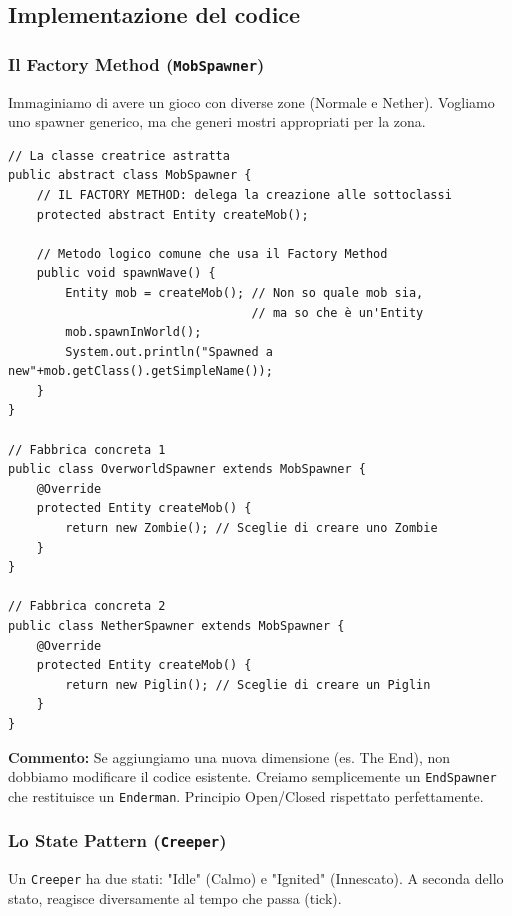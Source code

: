 \documentclass[12pt, a4paper]{article}
\begin{document}
\newpage

\subsection{Implementazione del codice}

\subsubsection{Il Factory Method (\texttt{MobSpawner})}
Immaginiamo di avere un gioco con diverse zone (Normale e Nether). Vogliamo uno spawner generico, ma che generi mostri appropriati per la zona.

\begin{verbatim}
// La classe creatrice astratta
public abstract class MobSpawner {
    // IL FACTORY METHOD: delega la creazione alle sottoclassi
    protected abstract Entity createMob(); 

    // Metodo logico comune che usa il Factory Method
    public void spawnWave() {
        Entity mob = createMob(); // Non so quale mob sia, 
                                  // ma so che è un'Entity
        mob.spawnInWorld();
        System.out.println("Spawned a new"+mob.getClass().getSimpleName());
    }
}

// Fabbrica concreta 1
public class OverworldSpawner extends MobSpawner {
    @Override
    protected Entity createMob() {
        return new Zombie(); // Sceglie di creare uno Zombie
    }
}

// Fabbrica concreta 2
public class NetherSpawner extends MobSpawner {
    @Override
    protected Entity createMob() {
        return new Piglin(); // Sceglie di creare un Piglin
    }
}
\end{verbatim}
\textbf{Commento:} Se aggiungiamo una nuova dimensione (es. The End), non dobbiamo modificare il codice esistente. Creiamo semplicemente un \texttt{EndSpawner} che restituisce un \texttt{Enderman}. Principio Open/Closed rispettato perfettamente.

\newpage

\subsubsection{Lo State Pattern (\texttt{Creeper})}
Un \texttt{Creeper} ha due stati: "Idle" (Calmo) e "Ignited" (Innescato). A seconda dello stato, reagisce diversamente al tempo che passa (tick).
\end{document}
